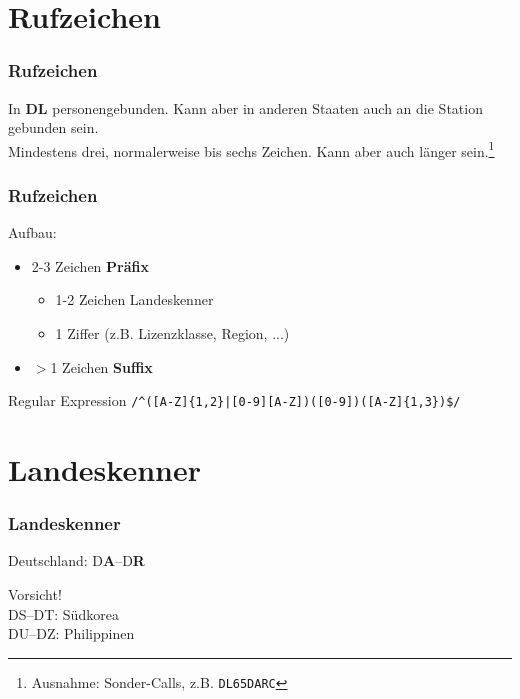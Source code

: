 \section{Rufzeichen}

\begin{frame}
    \frametitle{Rufzeichen}

    In \textbf{DL} personengebunden. Kann aber in anderen Staaten auch an die Station
    gebunden sein. \\[1em]

    Mindestens drei, normalerweise bis sechs Zeichen. Kann aber auch länger
    sein.\footnote{\scriptsize Ausnahme: Sonder-Calls, z.B.
    \texttt{DL65DARC}}

\end{frame}

\begin{frame}[fragile]
    \frametitle{Rufzeichen}

    Aufbau:

    \begin{itemize}
        \item 2-3 Zeichen \textbf{Präfix}
        \begin{itemize}
            \item 1-2 Zeichen Landeskenner
            \item 1 Ziffer (z.B. Lizenzklasse, Region, ...)
        \end{itemize}
        \item $>$1 Zeichen \textbf{Suffix}
    \end{itemize}

    \pause

    \begin{block}{Regular Expression}
        \verb+/^([A-Z]{1,2}|[0-9][A-Z])([0-9])([A-Z]{1,3})$/+
    \end{block}


\end{frame}

\section{Landeskenner}

\begin{frame}
    \frametitle{Landeskenner}

    \begin{center}
        Deutschland: D\textbf{A}--D\textbf{R} \\[1em]
    \end{center}

    Vorsicht! \\
    DS--DT: Südkorea \\
    DU--DZ: Philippinen \\[1em]

\end{frame}

